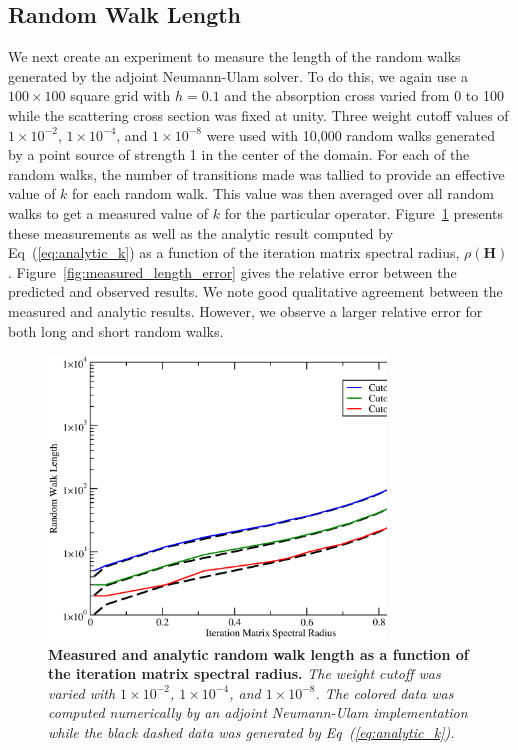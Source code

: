 \documentclass[preprint,11pt]{elsarticle}
\newcommand{\ve}[1]{\ensuremath{\mathbf{#1}}}
\newcommand{\sn}[2]{\ensuremath{#1\times 10^{#2}}}
\begin{document}
\subsection{Random Walk Length}
\label{subsec:walk_length}

We next create an experiment to measure the length of the random walks
generated by the adjoint Neumann-Ulam solver. To do this, we again use a $100
\times 100$ square grid with $h=0.1$ and the absorption cross varied from 0 to
100 while the scattering cross section was fixed at unity. Three weight cutoff
values of \sn{1}{-2}, \sn{1}{-4}, and \sn{1}{-8} were used with 10,000 random
walks generated by a point source of strength 1 in the center of the
domain. For each of the random walks, the number of transitions made was
tallied to provide an effective value of $k$ for each random walk. This value
was then averaged over all random walks to get a measured value of $k$ for the
particular operator. Figure~\ref{fig:measured_length} presents these
measurements as well as the analytic result computed by
Eq~(\ref{eq:analytic_k}) as a function of the iteration matrix spectral
radius, $\rho(\ve{H})$. Figure~\ref{fig:measured_length_error} gives the
relative error between the predicted and observed results. We note good
qualitative agreement between the measured and analytic results. However, we
observe a larger relative error for both long and short random walks.
\begin{figure}[ht!]
  \begin{center}
    \includegraphics[width=0.8\textwidth]{random_walk_length.eps}
  \end{center}
  \caption{\textbf{Measured and analytic random walk length as a function of
      the iteration matrix spectral radius.} \textit{The weight cutoff was
      varied with \sn{1}{-2}, \sn{1}{-4}, and \sn{1}{-8}. The colored data was
      computed numerically by an adjoint Neumann-Ulam implementation while the
      black dashed data was generated by Eq~(\ref{eq:analytic_k}).}}
  \label{fig:measured_length}
\end{figure}
\end{document}
